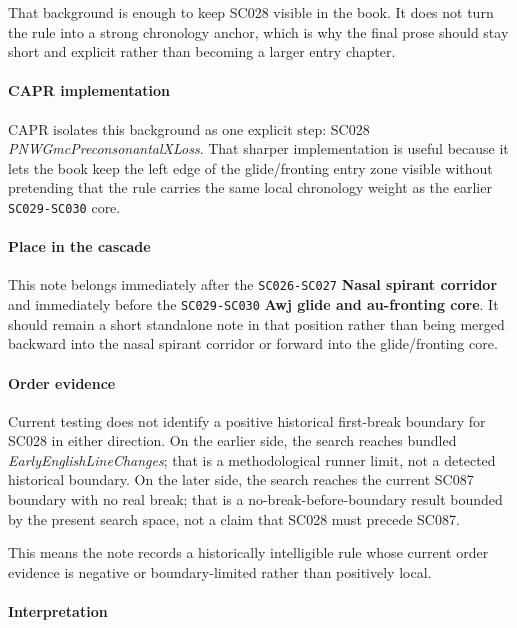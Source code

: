 \documentclass[
  british,
  a4paper,
]{article}
\begin{document}
That background is enough to keep SC028 visible in the book. It does not
turn the rule into a strong chronology anchor, which is why the final
prose should stay short and explicit rather than becoming a larger entry
chapter.

\paragraph{CAPR implementation}\label{capr-implementation-20}

CAPR isolates this background as one explicit step: SC028
\emph{PNWGmcPreconsonantalXLoss}. That sharper implementation is useful
because it lets the book keep the left edge of the glide/fronting entry
zone visible without pretending that the rule carries the same local
chronology weight as the earlier \texttt{SC029-SC030} core.

\paragraph{Place in the cascade}\label{place-in-the-cascade-20}

This note belongs immediately after the \texttt{SC026-SC027}
\textbf{Nasal spirant corridor} and immediately before the
\texttt{SC029-SC030} \textbf{Awj glide and au-fronting core}. It should
remain a short standalone note in that position rather than being merged
backward into the nasal spirant corridor or forward into the
glide/fronting core.

\paragraph{Order evidence}\label{order-evidence-20}

Current testing does not identify a positive historical first-break
boundary for SC028 in either direction. On the earlier side, the search
reaches bundled \emph{EarlyEnglishLineChanges}; that is a methodological
runner limit, not a detected historical boundary. On the later side, the
search reaches the current SC087 boundary with no real break; that is a
no-break-before-boundary result bounded by the present search space, not
a claim that SC028 must precede SC087.

This means the note records a historically intelligible rule whose
current order evidence is negative or boundary-limited rather than
positively local.

\paragraph{Interpretation}\label{interpretation-20}
\end{document}
